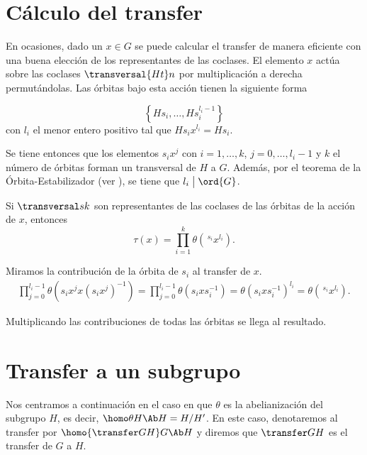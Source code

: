 \section{Cálculo del transfer}

En ocasiones, dado un $x\in G$ se puede calcular el transfer de manera eficiente con una buena elección de los representantes de las coclases. El elemento $x$ actúa sobre las coclases $\transversal {Ht} n$ por multiplicación a derecha permutándolas. Las órbitas bajo esta acción tienen la siguiente forma

\begin{equation}
	\left\{Hs_i,\ldots,Hs_i^{l_i-1}\right\}
\end{equation}
con $l_i$ el menor entero positivo tal que $Hs_ix^{l_i} = Hs_i$.

Se tiene entonces que los elementos $s_ix^j$ con $i=1,\ldots,k$, $j=0,\ldots,l_i-1$ y $k$ el número de órbitas forman un transversal de $H$ a $G$. Además, por el teorema de la Órbita-Estabilizador (ver \cite[1.6.1]{Robinson}), se tiene que $l_i \bigm| \ord{G}$.

\begin{lema}
	Si $\transversal s k$ son representantes de las coclases de las órbitas de la acción de $x$, entonces
	\begin{equation}
		 \tau(x) = \prod_{i=1}^k \theta(\,^{s_i}x^{l_i}).
	\end{equation}
	\begin{demostracion}
		Miramos la contribución de la órbita de $s_i$ al transfer de $x$.
		\begin{align*}
			\prod_{j=0}^{l_i-1}\theta(s_ix^j x (s_ix^j)^{-1}) = \prod_{j=0}^{l_i-1}\theta(s_ixs_i^{-1}) = \theta(s_ixs_i^{-1})^{l_i} = \theta(\,^{s_i}x^{l_i}).
		\end{align*}
		
		Multiplicando las contribuciones de todas las órbitas se llega al resultado.
	\end{demostracion}
\end{lema}

\section{Transfer a un subgrupo}

Nos centramos a continuación en el caso en que $\theta$ es la abelianización del subgrupo $H$, es decir, $\homo \theta H {\Ab H} = H/H'$. En este caso, denotaremos al transfer por $\homo {\transfer G H} G {\Ab H}$ y diremos que $\transfer G H$ es el transfer de $G$ a $H$.


